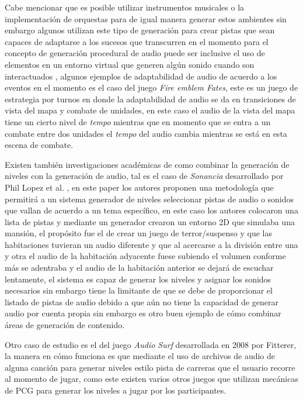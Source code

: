 Cabe mencionar que es posible utilizar instrumentos musicales o la
implementación de orquestas para de igual manera generar estos ambientes sin
embargo algunos utilizan este tipo de generación para crear pistas que sean
capaces de adaptarse a los sucesos que transcurren en el momento para el
concepto de generación procedural de audio puede ser inclusive el uso de
elementos en un entorno virtual que generen algún sonido cuando son
interactuados \cite{garner2014sonic}, algunos ejemplos de adaptabilidad de audio
de acuerdo a los eventos en el momento es el caso del juego \textit{Fire emblem
Fates}, este es un juego de estrategia por turnos en donde la adaptabilidad de
audio se da en transiciones de vista del mapa y combate de unidades, en este
caso el audio de la vista del mapa tiene un cierto nivel de \textit{tempo}
mientras que en momento que se entra a un combate entre dos unidades el
\textit{tempo} del audio cambia mientras se está en esta escena de combate.

Existen también investigaciones académicas de como combinar la generación de
niveles con la generación de audio, tal es el caso de \textit{Sonancia}
desarrollado por Phil Lopez et al. \cite{lopes2015sonancia}, en este paper los
autores proponen una metodología que permitirá a un sistema generador de niveles
seleccionar pistas de audio o sonidos que vallan de acuerdo a un tema específico,
en este caso los autores colocaron una lista de pistas y mediante un generador
crearon un entorno 2D que simulaba una mansión, el propósito fue el de crear un
juego de terror/suspenso y que las habitaciones tuvieran un audio diferente y
que al acercarse a la división entre una y otra el audio de la habitación
adyacente fuese subiendo el volumen conforme más se adentraba y el audio de la
habitación anterior se dejará de escuchar lentamente, el sistema es capaz de
generar los niveles y asignar los sonidos necesarios sin embargo tiene la
limitante de que se debe de proporcionar el listado de pistas de audio debido a
que aún no tiene la capacidad de generar audio por cuenta propia sin embargo es
otro buen ejemplo de cómo combinar áreas de generación de contenido.

Otro caso de estudio es el del juego \textit{Audio Surf} desarrollada en 2008 por
Fitterer, la manera en cómo funciona es que mediante el uso de archivos de audio
de alguna canción para generar niveles estilo pista de carreras que el usuario
recorre al momento de jugar, como este existen varios otros juegos que utilizan
mecánicas de PCG para generar los niveles a jugar por los participantes.

